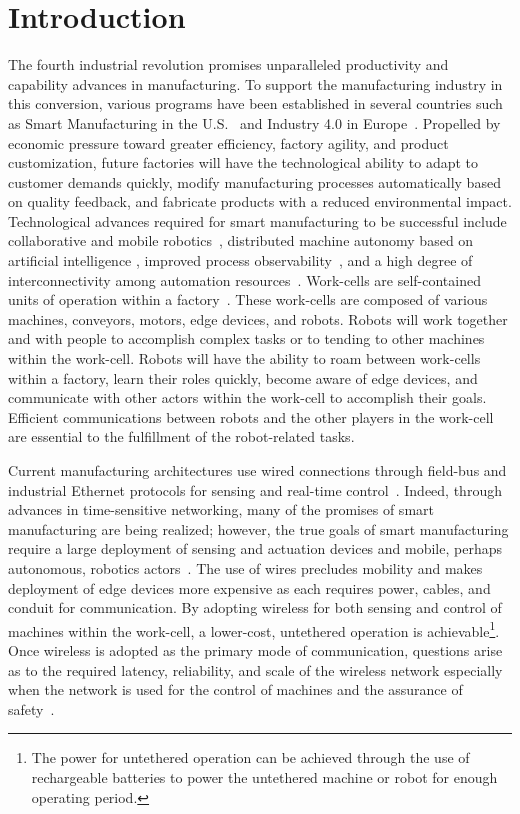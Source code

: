 \section{Introduction} \label{sysml:sec:intro}    
The fourth industrial revolution promises unparalleled productivity and capability advances in manufacturing. To support the manufacturing industry in this conversion, various programs have been established in several countries such as Smart Manufacturing in the U.S.~\cite{SmartManuf} and Industry 4.0 in Europe~\cite{Industry40, cpsInd4.0}. Propelled by economic pressure toward greater efficiency, factory agility, and product customization, future factories will have the technological ability to adapt to customer demands quickly, modify manufacturing processes automatically based on quality feedback, and fabricate products with a reduced environmental impact.  Technological advances required for smart manufacturing to be successful include collaborative and mobile robotics~\cite{indRobot2017}, distributed machine autonomy based on artificial intelligence \cite{ManufAI2009}, improved process observability~\cite{IIoToverview2018}, and a high degree of interconnectivity among automation resources~\cite{ieMag2018}. Work-cells are self-contained units of operation within a factory~\cite{CHEN2001199, JMarvel2017, 6059204}.  These work-cells are composed of various machines, conveyors, motors, edge devices, and robots.  Robots will work together and with people to accomplish complex tasks or to tending to other machines within the work-cell.  Robots will have the ability to roam between work-cells within a factory, learn their roles quickly, become aware of edge devices, and communicate with other actors within the work-cell to accomplish their goals. Efficient communications between robots and the other players in the work-cell are essential to the fulfillment of the robot-related tasks.



Current manufacturing architectures use wired connections through field-bus and industrial Ethernet protocols for sensing and real-time control~\cite{etherCAT, indPrinter}.  Indeed, through advances in time-sensitive networking, many of the promises of smart manufacturing are being realized; however, the true goals of smart manufacturing require a large deployment of sensing and actuation devices and mobile, perhaps autonomous, robotics actors~\cite{ieMag2018}.  The use of wires precludes mobility and makes deployment of edge devices more expensive as each  requires power, cables, and conduit for communication. By adopting wireless for both sensing and control of machines within the work-cell, a lower-cost, untethered operation is achievable\footnote{The power for untethered operation can be achieved through the use of rechargeable batteries to power the untethered machine or robot for enough operating period.}. Once wireless is adopted as the primary mode of communication, questions arise as to the required latency, reliability, and scale of the wireless network especially when the network is used for the control of machines and the assurance of safety~\cite{ieMag2018}. 

